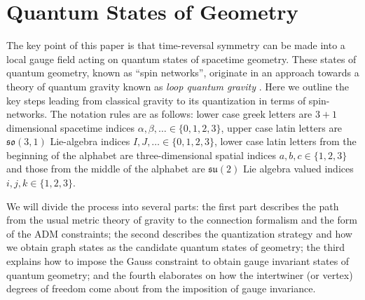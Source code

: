\documentclass[preprint]{SciPost}
\newcommand{\mf}[1]{\mathfrak{#1}}
\theoremstyle{plain} %
\begin{document}
\section{Quantum States of Geometry}\label{sec:quantum-geometry}

The key point of this paper is that time-reversal symmetry can be made into a local gauge field acting on quantum states of spacetime geometry. These states of quantum geometry, known as ``spin networks'', originate in an approach towards a theory of quantum gravity known as \emph{loop quantum gravity} \cite{Rovelli2014Covariant, Vaid2016LQG-for-the-Bewildered}. Here we outline the key steps leading from classical gravity to its quantization in terms of spin-networks. The notation rules are as follows: lower case greek letters are $ 3+1 $ dimensional spacetime indices $ \alpha, \beta, \ldots \in \{0,1,2,3\} $, upper case latin letters are $ \mf{so}(3,1) $ Lie-algebra indices $ I, J, \ldots \in \{0,1,2,3\} $, lower case latin letters from the beginning of the alphabet are three-dimensional spatial indices $ a,b,c \in \{1,2,3\} $ and those from the middle of the alphabet are $ \mf{su}(2) $ Lie algebra valued indices $ i,j,k \in \{1,2,3\} $.

We will divide the process into several parts: the first part describes the path from the usual metric theory of gravity to the connection formalism and the form of the ADM constraints; the second describes the quantization strategy and how we obtain graph states as the candidate quantum states of geometry; the third explains how to impose the Gauss constraint to obtain gauge invariant states of quantum geometry; and the fourth elaborates on how the intertwiner (or vertex) degrees of freedom come about from the imposition of gauge invariance.
\end{document}
